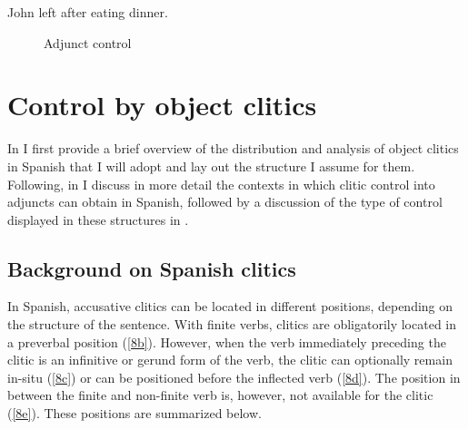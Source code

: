 \documentclass[output=paper,colorlinks,citecolor=brown]{langscibook}
\begin{document}
\ea \label{actree} John left after eating dinner.
\z

\begin{figure}
\caption{Adjunct control}
\label{fig:actree}
\end{figure}




\section{Control by object clitics} \label{Section 3}
In  I first provide a brief overview of the distribution and analysis of object clitics in Spanish that I will adopt and lay out the structure I assume for them. Following, in  I discuss in more detail the contexts in which clitic control into adjuncts can obtain in Spanish, followed by a discussion of the type of control displayed in these structures in .
\subsection{Background on Spanish clitics} \label{section3.1}
In Spanish, accusative clitics can be located in different positions, depending on the structure of the sentence. With finite verbs, clitics are obligatorily located in a preverbal position (\ref{8b}). However, when the verb immediately preceding the clitic is an infinitive or gerund form of the verb, the clitic can optionally remain in-situ (\ref{8c}) or can be positioned before the inflected verb (\ref{8d}). The position in between the finite and non-finite verb is, however, not available for the
clitic (\ref{8e}). These positions are summarized below.
\end{document}
